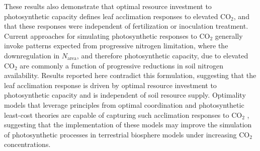 These results also demonstrate that optimal resource investment to photosynthetic capacity defines leaf acclimation responses to elevated CO$_2$, and that these responses were independent of fertilization or inoculation treatment. Current approaches for simulating photosynthetic responses to CO$_2$ generally invoke patterns expected from progressive nitrogen limitation, where the downregulation in $N_\mathrm{area}$, and therefore photosynthetic capacity, due to elevated CO$_2$ are commonly a function of progressive reductions in soil nitrogen availability. Results reported here contradict this formulation, suggesting that the leaf acclimation response is driven by optimal resource investment to photosynthetic capacity and is independent of soil resource supply. Optimality models that leverage principles from optimal coordination and photosynthetic least-cost theories  are capable of capturing such acclimation responses to CO$_2$ , suggesting that the implementation of these models may improve the simulation of photosynthetic processes in terrestrial biosphere models under increasing CO$_2$ concentrations.


